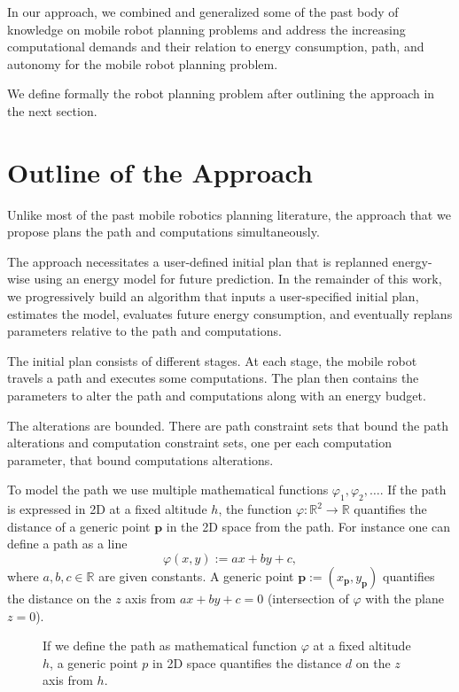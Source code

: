 In our approach, we combined and generalized some of the past body of knowledge on mobile robot planning problems and address the increasing computational demands and their relation to energy consumption, path, and autonomy for the mobile robot planning problem. 

We define formally the robot planning problem after outlining the approach in the next section.


\section{Outline of the Approach}
\label{sec:outline}

Unlike most of the past mobile robotics planning literature, the approach that we propose plans the path and computations simultaneously. 

The approach necessitates a user-defined initial plan that is replanned energy-wise using an energy model for future prediction. In the remainder of this work, we progressively build an algorithm that inputs a user-specified initial plan, estimates the model, evaluates future energy consumption, and eventually replans parameters relative to the path and computations. 

The initial plan consists of different stages. At each stage, the mobile robot travels a path and executes some computations. The plan then contains the parameters to alter the path and computations along with an energy budget.

The alterations are bounded. There are path constraint sets that bound the path alterations and computation constraint sets, one per each computation parameter, that bound computations alterations.

To model the path we use multiple mathematical functions $\varphi_1,\varphi_2,\dots$. If the path is expressed in 2D at a fixed altitude $h$, the function $\varphi:\mathbb{R}^2\rightarrow\mathbb{R}$ quantifies the distance of a generic point $\mathbf{p}$ in the 2D space from the path. For instance one can define a path as a line
\begin{equation}\label{eq:basic-path}
  \varphi(x,y):=ax+by+c,
\end{equation}
where $a,b,c\in\mathbb{R}$ are given constants. A generic point $\mathbf{p}:=(x_{\mathbf{p}},y_{\mathbf{p}})$ quantifies the distance on the $z$ axis from $ax+by+c=0$ (intersection of $\varphi$ with the plane $z=0$).

\begin{figure}[t]
  \centering
  
  \caption[Concept of the path and generic point in space]{If we define the path as mathematical function $\varphi$ at a fixed altitude $h$, a generic point $p$ in 2D space quantifies the distance $d$ on the $z$ axis from $h$.}
  \label{fig:plot1}
\end{figure}

